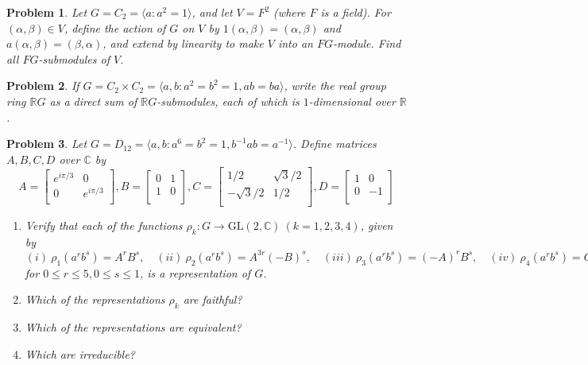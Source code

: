 \documentclass[10pt]{article}
\newcommand{\sk}{\vskip 10mm}
\newcommand{\bb}[1]{\mathbb{#1}}
\theoremstyle{plain}
\newtheorem{problem}{Problem}
\theoremstyle{remark}
\begin{document}
\begin{problem}
  Let $G=C_2=\langle a:a^2=1\rangle$, and let $V=F^2$ (where $F$ is a field).
  For $(\alpha,\beta)\in V$, define the action of $G$ on $V$ by
  $1(\alpha,\beta)=(\alpha,\beta)$ and $a(\alpha,\beta)=(\beta,\alpha)$, and
  extend by linearity to make $V$ into an $FG$-module. Find all $FG$-submodules
  of $V$.
\end{problem}

\sk

\begin{problem}
  If $G=C_2\times C_2=\langle a,b:a^2=b^2=1,ab=ba\rangle$, write the real group
  ring $\bb{R}G$ as a direct sum of $\bb{R}G$-submodules, each of which
  is $1$-dimensional over $\bb{R}$.
\end{problem}

\sk

\begin{problem}
  Let $G=D_{12}=\langle a,b:a^6=b^2=1,b^{-1}ab=a^{-1}\rangle$.
  Define matrices $A,B,C,D$ over $\bb{C}$ by
  \[
    A
    =
    \left[
      \begin{array}{cc}
        e^{i\pi/3} & 0\\
        0 & e^{i\pi/3}\\
      \end{array}
    \right],
    B
    =
    \left[
      \begin{array}{cc}
        0 & 1\\
        1 & 0\\
      \end{array}
    \right],
    C
    =
    \left[
      \begin{array}{cc}
        1/2 & \sqrt{3}/2\\
        -\sqrt{3}/2 & 1/2\\
      \end{array}
    \right],
    D
    =
    \left[
      \begin{array}{cc}
        1 & 0\\
        0 & -1\\
      \end{array}
    \right]
  \]
  \begin{enumerate}
  \item[(a)] Verify that each of the functions
    $\rho_k:G\rightarrow\text{GL}(2,\bb{C})\ (k=1,2,3,4)$, given by
    $(i)\ \rho_1(a^r b^s)=A^r B^s,\quad
    (ii)\ \rho_2(a^r b^s)= A^{3r}(-B)^s,\quad
    (iii)\ \rho_3(a^r b^s)=(-A)^r B^s,\quad
    (iv)\ \rho_4(a^r b^s)=C^r D^s$
    for $0\leq r\leq 5, 0\leq s\leq 1$, is a representation of $G$.
  \item[(b)] Which of the representations $\rho_k$ are faithful?
  \item[(c)] Which of the representations are equivalent?
  \item[(d)] Which are irreducible?
  \end{enumerate}
\end{problem}
\end{document}
